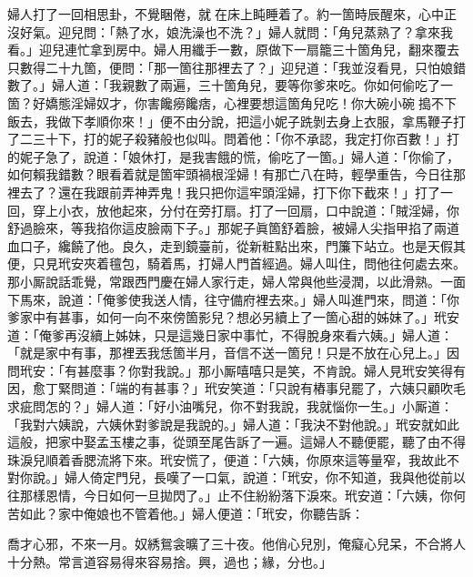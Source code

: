 婦人打了一回相思卦，不覺睏倦，就𢱉在床上盹睡着了。約一箇時辰醒來，心中正沒好氣。{}迎兒問：「熱了水，娘洗澡也不洗？」婦人就問：「角兒蒸熟了？拿來我看。」迎兒連忙拿到房中。婦人用纖手一數，原做下一扇籠三十箇角兒，翻來覆去只數得二十九箇，便問：「那一箇往那裡去了？」迎兒道：「我並沒看見，只怕娘錯數了。」婦人道：「我親數了兩遍，三十箇角兒，要等你爹來吃。你如何偷吃了一箇？好嬌態淫婦奴才，{}你害饞癆饞痞，心裡要想這箇角兒吃！你大碗小碗𠳹搗不下飯去，我做下孝順你來！」便不由分說，把這小妮子跣剝去身上衣服，拿馬鞭子打了二三十下，打的妮子殺豬般也似叫。問着他：「你不承認，我定打你百數！」打的妮子急了，說道：「娘休打，是我害餓的慌，偷吃了一箇。」婦人道：「你偷了，如何賴我錯數？眼看着就是箇牢頭禍根淫婦！有那亡八在時，輕學重告，今日往那裡去了？還在我跟前弄神弄鬼！{}我只把你這牢頭淫婦，打下你下截來！」打了一回，穿上小衣，放他起來，分付在旁打扇。打了一回扇，口中說道：「賊淫婦，你舒過臉來，等我掐你這皮臉兩下子。」那妮子眞箇舒着臉，被婦人尖指甲掐了兩道血口子，{}纔饒了他。良久，走到鏡臺前，從新粧點出來，門簾下站立。也是天假其便，只見玳安夾着氊包，騎着馬，打婦人門首經過。婦人叫住，問他往何處去來。那小厮說話乖覺，常跟西門慶在婦人家行走，婦人常與他些浸潤，以此滑熟。一面下馬來，說道：「俺爹使我送人情，往守備府裡去來。」婦人叫進門來，問道：「你爹家中有甚事，如何一向不來傍箇影兒？想必另續上了一箇心甜的姊妹了。」玳安道：「俺爹再沒續上姊妹，只是這幾日家中事忙，不得脫身來看六姨。」婦人道：「就是家中有事，那裡丟我恁箇半月，音信不送一箇兒！只是不放在心兒上。」因問玳安：「有甚麼事？你對我說。」那小厮嘻嘻只是笑，不肯說。{}婦人見玳安笑得有因，愈丁緊問道：「端的有甚事？」玳安笑道：「只說有樁事兒罷了，六姨只顧吹毛求疵問怎的？」婦人道：「好小油嘴兒，你不對我說，我就惱你一生。」{}小厮道：「我對六姨說，六姨休對爹說是我說的。」婦人道：「我決不對他說。」玳安就如此這般，把家中娶孟玉樓之事，從頭至尾告訴了一遍。這婦人不聽便罷，聽了由不得珠淚兒順着香腮流將下來。玳安慌了，便道：「六姨，你原來這等量窄，我故此不對你說。」婦人倚定門兒，長嘆了一口氣，說道：「玳安，你不知道，我與他從前以往那樣恩情，今日如何一旦拋閃了。」止不住紛紛落下淚來。玳安道：「六姨，你何苦如此？家中俺娘也不管着他。」婦人便道：「玳安，你聽告訴：

\begin{myquote} 
喬才心邪，不來一月。奴綉鴛衾曠了三十夜。他俏心兒別，俺癡心兒呆，不合將人十分熱。常言道容易得來容易捨。興，過也；緣，分也。」
\end{myquote} 

